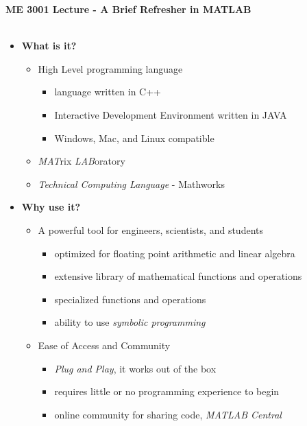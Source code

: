 \documentclass[11pt]{article}
\begin{document}
\textbf{ \LARGE ME 3001 Lecture - A Brief Refresher in MATLAB} \\\\

\begin{itemize}

	\item  \textbf{\LARGE What is it?}
		\LARGE
		\begin{itemize}
			\item High Level programming language
				\begin{itemize}
					\item language written in C++
					\item Interactive Development Environment written in JAVA 
					\item Windows, Mac, and Linux compatible
				\end{itemize}
			\item {\it MAT}rix {\it LAB}oratory
			\item {\it Technical Computing Language} - Mathworks
		\end{itemize}	

	\item \textbf{\LARGE Why use it?}
		\begin{itemize}
			\item A powerful tool for engineers, scientists, and students
				\begin{itemize}	
					\item  optimized for floating point arithmetic and linear algebra
					\item extensive library of mathematical functions and operations 
					\item specialized functions and operations
						\begin{itemize}
						\end{itemize}
					\item ability to use {\it symbolic programming }	
				\end{itemize}
			\item Ease of Access and Community
				\begin{itemize}
					\item {\it Plug and Play}, it works out of the box
					\item requires little or no programming experience to begin
					\item online community for sharing code,  {\it MATLAB Central}
				\end{itemize}
		\end{itemize}


\end{itemize}
\end{document}
